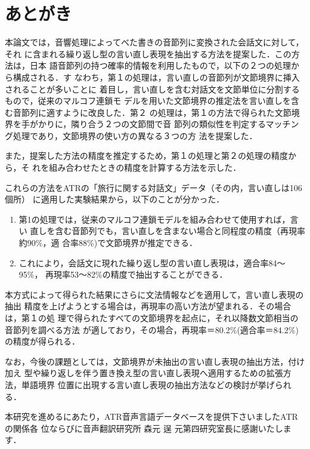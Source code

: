 \section{あとがき}

本論文では，音響処理によってべた書きの音節列に変換された会話文に対して，それ
に含まれる繰り返し型の言い直し表現を抽出する方法を提案した．この方法は，日本
語音節列の持つ確率的情報を利用したもので，以下の２つの処理から構成される．す
なわち，第１の処理は，言い直しの音節列が文節境界に挿入されることが多いことに
着目し，言い直しを含む対話文を文節単位に分割するもので，従来のマルコフ連鎖モ
デルを用いた文節境界の推定法を言い直しを含む音節列に適すように改良した．第２
の処理は，第１の方法で得られた文節境界を手がかりに，隣り合う２つの文節間で音
節列の類似性を判定するマッチング処理であり，文節境界の使い方の異なる３つの方
法を提案した．

また，提案した方法の精度を推定するため，第１の処理と第２の処理の精度から，そ
れを組み合わせたときの精度を計算する方法を示した．

これらの方法をATRの「旅行に関する対話文」データ（その内，言い直しは106個所）
に適用した実験結果から，以下のことが分かった．
\smallskip
\begin{enumerate}
\item 第1の処理では，従来のマルコフ連鎖モデルを組み合わせて使用すれば，言い
直しを含む音節列でも，言い直しを含まない場合と同程度の精度（再現率約90\%，適
合率88\%)で文節境界が推定できる．
\item これにより，会話文に現れた繰り返し型の言い直し表現は，適合率84〜95\%，
再現率53〜82\%の精度で抽出することができる．
\smallskip
\end{enumerate}

本方式によって得られた結果にさらに文法情報などを適用して，言い直し表現の抽出
精度を上げようとする場合は，再現率の高い方法が望まれる．その場合は，第１の処
理で得られたすべての文節境界を起点に，それ以降数文節相当の音節列を調べる方法
が適しており，その場合，再現率＝80.2\%(適合率＝84.2\%)の精度が得られる．

なお，今後の課題としては，文節境界が未抽出の言い直し表現の抽出方法，付け加え
型や繰り返しを伴う置き換え型の言い直し表現へ適用するための拡張方法，単語境界
位置に出現する言い直し表現の抽出方法などの検討が挙げられる．
\Vspace

\acknowledgment

本研究を進めるにあたり，ATR音声言語データベースを提供下さいましたATRの関係各
位ならびに音声翻訳研究所 森元 逞 元第四研究室長に感謝いたします．
\vspace*{-3mm}

